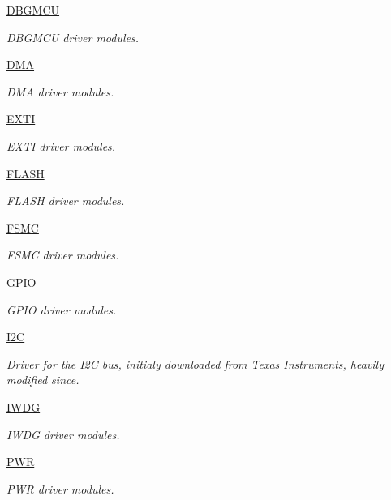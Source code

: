 \begin{DoxyCompactItemize}
\hyperlink{group___d_b_g_m_c_u}{D\+B\+G\+M\+CU}
\begin{DoxyCompactList}\small\item\em D\+B\+G\+M\+CU driver modules. \end{DoxyCompactList}\item 
\hyperlink{group___d_m_a}{D\+MA}
\begin{DoxyCompactList}\small\item\em D\+MA driver modules. \end{DoxyCompactList}\item 
\hyperlink{group___e_x_t_i}{E\+X\+TI}
\begin{DoxyCompactList}\small\item\em E\+X\+TI driver modules. \end{DoxyCompactList}\item 
\hyperlink{group___f_l_a_s_h}{F\+L\+A\+SH}
\begin{DoxyCompactList}\small\item\em F\+L\+A\+SH driver modules. \end{DoxyCompactList}\item 
\hyperlink{group___f_s_m_c}{F\+S\+MC}
\begin{DoxyCompactList}\small\item\em F\+S\+MC driver modules. \end{DoxyCompactList}\item 
\hyperlink{group___g_p_i_o}{G\+P\+IO}
\begin{DoxyCompactList}\small\item\em G\+P\+IO driver modules. \end{DoxyCompactList}\item 
\hyperlink{group___i2_c}{I2C}
\begin{DoxyCompactList}\small\item\em Driver for the I2C bus, initialy downloaded from Texas Instruments, heavily modified since. \end{DoxyCompactList}\item 
\hyperlink{group___i_w_d_g}{I\+W\+DG}
\begin{DoxyCompactList}\small\item\em I\+W\+DG driver modules. \end{DoxyCompactList}\item 
\hyperlink{group___p_w_r}{P\+WR}
\begin{DoxyCompactList}\small\item\em P\+WR driver modules. \end{DoxyCompactList}\item 

\end{DoxyCompactItemize}
